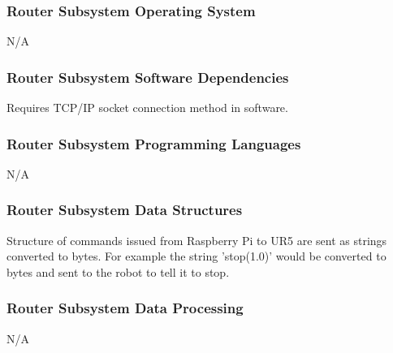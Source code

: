 \subsubsection{Router Subsystem Operating System}
N/A

\subsubsection{Router Subsystem Software Dependencies}
Requires TCP/IP socket connection method in software.

\subsubsection{Router Subsystem Programming Languages}
N/A

\subsubsection{Router Subsystem Data Structures}
Structure of commands issued from Raspberry Pi to UR5 are sent as strings converted to bytes. For example the string 'stop(1.0)' would be converted to bytes and sent to the robot to tell it to stop.

\subsubsection{Router Subsystem Data Processing}
N/A


